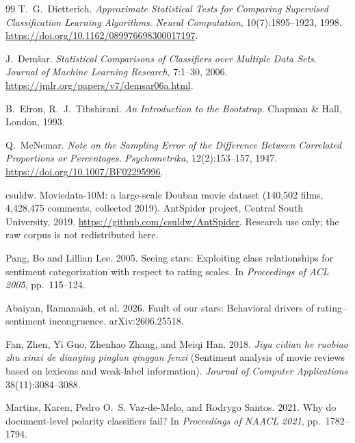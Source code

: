 \documentclass[11pt,a4paper]{article}
\begin{document}
\begin{thebibliography}{99}
T.~G.~Dietterich.
\newblock \emph{Approximate Statistical Tests for Comparing Supervised Classification Learning Algorithms}.
\newblock \emph{Neural Computation}, 10(7):1895--1923, 1998.
\newblock \url{https://doi.org/10.1162/089976698300017197}.

J.~Dem\v{s}ar.
\newblock \emph{Statistical Comparisons of Classifiers over Multiple Data Sets}.
\newblock \emph{Journal of Machine Learning Research}, 7:1--30, 2006.
\newblock \url{https://jmlr.org/papers/v7/demsar06a.html}.

B.~Efron, R.~J.~Tibshirani.
\newblock \emph{An Introduction to the Bootstrap}.
\newblock Chapman \& Hall, London, 1993.

Q.~McNemar.
\newblock \emph{Note on the Sampling Error of the Difference Between Correlated Proportions or Percentages}.
\newblock \emph{Psychometrika}, 12(2):153--157, 1947.
\newblock \url{https://doi.org/10.1007/BF02295996}.

csuldw. Moviedata-10M: a large-scale Douban movie dataset (140{,}502
films, 4{,}428{,}475 comments, collected 2019).
\newblock AntSpider project, Central South University, 2019.
\newblock \url{https://github.com/csuldw/AntSpider}. Research use only;
the raw corpus is not redistributed here.

Pang, Bo and Lillian Lee. 2005.
\newblock Seeing stars: Exploiting class relationships for sentiment
categorization with respect to rating scales.
\newblock In \emph{Proceedings of ACL 2005}, pp.~115--124.

Abaiyan, Ramanaish, et al. 2026.
\newblock Fault of our stars: Behavioral drivers of rating--sentiment
incongruence.
\newblock arXiv:2606.25518.

Fan, Zhen, Yi Guo, Zhenhao Zhang, and Meiqi Han. 2018.
\newblock \emph{Jiyu cidian he ruobiao zhu xinxi de dianying pinglun
qinggan fenxi} (Sentiment analysis of movie reviews based on
lexicons and weak-label information).
\newblock \emph{Journal of Computer Applications} 38(11):3084--3088.

Martins, Karen, Pedro O.~S. Vaz-de-Melo, and Rodrygo Santos. 2021.
\newblock Why do document-level polarity classifiers fail?
\newblock In \emph{Proceedings of NAACL 2021}, pp.~1782--1794.


\end{thebibliography}
\end{document}
